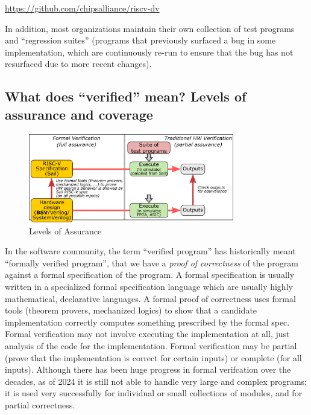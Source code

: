 \begin{tabbing}
\hmm \= \url{https://github.com/chipsalliance/riscv-dv}
\end{tabbing}

In addition, most organizations maintain their own collection of test
programs and ``regression suites'' (programs that previously surfaced
a bug in some implementation, which are continuously re-run to ensure
that the bug has not resurfaced due to more recent changes).


\subsection{What does ``verified'' mean? Levels of assurance and coverage}


\begin{figure}[htbp]
  \centerline{\includegraphics[width=0.8\textwidth,angle=0]{Figures/Fig_Levels_of_Assurance}}
  \caption{\label{Fig_Levels_of_Assurance}
           Levels of Assurance}
\end{figure}

In the software community, the term ``verified program'' has
historically meant ``formally verified program'', {\ie} that we have a
\emph{proof of correctness} of the program against a formal
specification of the program.  A formal specification is usually
written in a specialized formal specification language which are
usually highly mathematical, declarative languages.  A formal proof of
correctness uses formal tools (theorem provers, mechanized logics) to
show that a candidate implementation correctly computes something
prescribed by the formal spec.  Formal verification may not involve
executing the implementation at all, just analysis of the code for the
implementation.  Formal verification may be partial (prove that the
implementation is correct for certain inputs) or complete (for all
inputs).  Although there has been huge progress in formal verifcation
over the decades, as of 2024 it is still not able to handle very large
and complex programs; it is used very successfully for individual or
small collections of modules, and for partial correctness.

